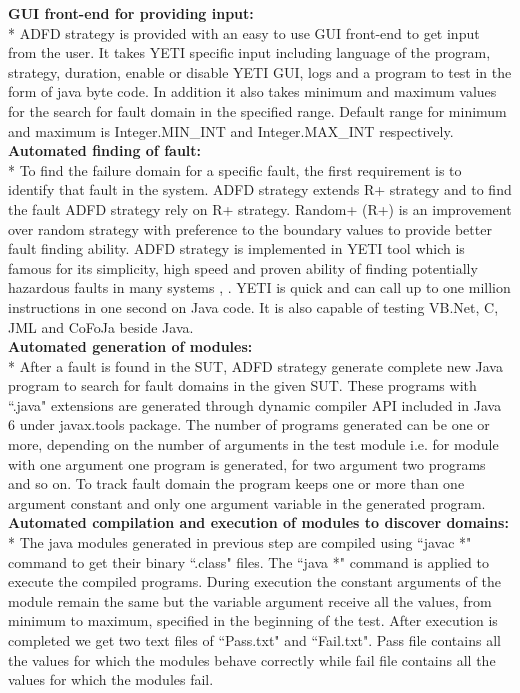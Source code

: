 \documentclass[runningheads,a4paper]{llncs}
\begin{document}
\noindent \textbf{GUI front-end for providing input:}\\*
\indent ADFD strategy is provided with an easy to use GUI front-end to get input from the user. It takes YETI specific input including language of the program, strategy, duration, enable or disable YETI GUI, logs and a program to test in the form of java byte code. In addition it also takes minimum and maximum values for the search for fault domain in the specified range. Default range for minimum and maximum is Integer.MIN\_INT and Integer.MAX\_INT respectively.\\

\noindent \textbf{Automated finding of fault:}\\*
\indent To find the failure domain for a specific fault, the first requirement is to identify that fault in the system. ADFD strategy extends R+ strategy and to find the fault ADFD strategy rely on R+ strategy. Random+ (R+) is an improvement over random strategy with preference to the boundary values to provide better fault finding ability. ADFD strategy is implemented in YETI tool which is famous for its simplicity, high speed and proven ability of finding potentially hazardous faults in many systems \cite{Oriol2011},  \cite{Oriol2012}. YETI is quick and can call up to one million instructions in one second on Java code. It is also capable of testing VB.Net, C, JML and CoFoJa beside Java. \\

\noindent \textbf{Automated generation of modules:}\\*
\indent  After a fault is found in the SUT, ADFD strategy generate complete new Java program to search for fault domains in the given SUT.  These programs with ``.java" extensions are generated through dynamic compiler API included in Java 6 under javax.tools package. The number of programs generated can be one or more, depending on the number of arguments in the test module i.e. for module with one argument one program is generated, for two argument two programs and so on. To track fault domain the program keeps one or more than one argument constant and only one argument variable in the generated program.\\

\noindent \textbf{Automated compilation and execution of modules to discover domains:}\\*
\indent  The java modules generated in previous step are compiled using ``javac *" command to get their binary ``.class" files. The ``java *" command is applied to execute the compiled programs. During execution the constant arguments of the module remain the same but the variable argument receive all the values, from minimum to maximum, specified in the beginning of the test. After execution is completed we get two text files of ``Pass.txt" and ``Fail.txt". Pass file contains all the values for which the modules behave correctly while fail file contains all the values for which the modules fail.\\
\end{document}

